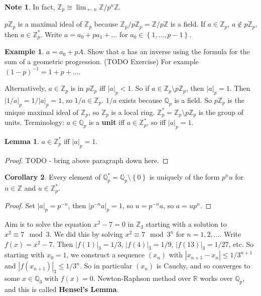 \documentclass{article}
\newcommand{\Z}{\mathbb{Z}}
\newcommand{\Q}{\mathbb{Q}}
\newcommand{\R}{\mathbb{R}}
\newcommand{\rb}[1]{\left( #1 \right)}
\newcommand{\cb}[1]{\left\{ #1 \right\}}
\newcommand{\abs}[1]{\left\lvert #1 \right\rvert}
\theoremstyle{definition}\newtheorem{definition}{Definition}[section]
\theoremstyle{definition}\newtheorem{remark}[definition]{Remark}
\theoremstyle{definition}\newtheorem*{example}{Example}
\theoremstyle{definition}\newtheorem*{note}{Note}
\newtheorem{lemma}[definition]{Lemma}
\newtheorem{corollary}[definition]{Corollary}
\begin{document}
\begin{note}
In fact, $ \Z_p \cong \lim_{\leftarrow n} \Z / p^n\Z $.
\end{note}

$ p\Z_p $ is a maximal ideal of $ \Z_p $ because $ \Z_p / p\Z_p = \Z / p\Z $ is a field. If $ a \in \Z_p $, $ a \notin p\Z_p $, then $ a \in \Z_p^* $. Write $ a = a_0 + pa_1 + \dots $ for $ a_0 \in \cb{1, \dots, p - 1} $.

\begin{example}
$ a = a_0 + pA $. Show that $ a $ has an inverse using the formula for the sum of a geometric progression. (TODO Exercise) For example $ \rb{1 - p}^{-1} = 1 + p + \dots $.
\end{example}

Alternatively, $ a \in \Z_p $ is in $ p\Z_p $ iff $ \abs{a}_p < 1 $. So if $ a \in \Z_p \setminus p\Z_p $, then $ \abs{a}_p = 1 $. Then $ \abs{1 / a}_p = 1 / \abs{a}_p = 1 $, so $ 1 / a \in \Z_p $. $ 1 / a $ exists because $ \Q_p $ is a field. So $ p\Z_p $ is the unique maximal ideal of $ \Z_p $, so $ \Z_p $ is a local ring. $ \Z_p^* = \Z_p \setminus p\Z_p $ is the group of units. Terminology: $ a \in \Q_p $ is a \textbf{unit} iff $ a \in \Z_p^* $, so iff $ \abs{a}_p = 1 $.

\begin{lemma}
$ a \in \Z_p^* $ iff $ \abs{a}_p = 1 $.
\end{lemma}

\begin{proof}
TODO - bring above paragraph down here.
\end{proof}

\begin{corollary}
Every element of $ \Q_p^* = \Q_p \setminus \cb{0} $ is uniquely of the form $ p^nu $ for $ n \in \Z $ and $ u \in \Z_p^* $.
\end{corollary}

\begin{proof}
Set $ \abs{a}_p = p^{-n} $, then $ \abs{p^{-n}a}_p = 1 $, so $ u = p^{-n}a $, so $ a = up^n $.
\end{proof}

Aim is to solve the equation $ x^2 - 7 = 0 $ in $ \Z_3 $ starting with a solution to $ x^2 \equiv 7 \mod 3 $. We did this by solving $ x^2 \equiv 7 \mod 3^n $ for $ n = 1, 2, \dots $. Write $ f\rb{x} = x^2 - 7 $. Then $ \abs{f\rb{1}}_3 = 1 / 3 $, $ \abs{f\rb{4}}_3 = 1 / 9 $, $ \abs{f\rb{13}}_3 = 1 / 27 $, etc. So starting with $ x_0 = 1 $, we construct a sequence $ \rb{x_n} $ with $ \abs{x_{n + 1} - x_n} \le 1 / 3^{n + 1} $ and $ \abs{f\rb{x_{n + 1}}}_3 \le 1 / 3^n $. So in particular $ \rb{x_n} $ is Cauchy, and so converges to some $ x \in \Q_3 $ with $ f\rb{x} = 0 $. Newton-Raphson method over $ \R $ works over $ \Q_p $, and this is called \textbf{Hensel's Lemma}.
\end{document}
